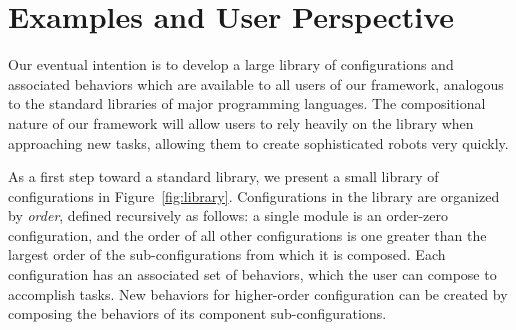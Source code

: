 \documentclass[graybox]{svmult}
\begin{document}
%
\section{Examples and User Perspective}
\label{sec:examples}
Our eventual intention is to develop a large library of configurations and associated
behaviors which are available to all users of our framework, analogous to the standard
libraries of major programming languages.  The compositional nature of our framework
will allow users to rely heavily on the library when approaching new tasks, allowing
them to create sophisticated robots very quickly.

As a first step toward a standard library, we present a small library of configurations
in Figure~\ref{fig:library}.
Configurations in the library are organized by \textit{order}, defined recursively
as follows: a single module is an order-zero configuration, and the order of all
other configurations is one greater than the largest order of the sub-configurations
from which it is composed. Each configuration has an associated set of behaviors,
which the user can compose to accomplish tasks.  New behaviors for higher-order configuration can be created by composing the behaviors of its component sub-configurations.
\end{document}
